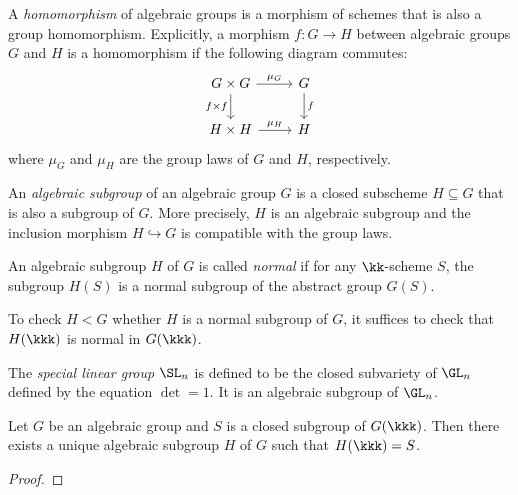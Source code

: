    \begin{definition}\label{def:homomorphism_of_algebraic_groups}
        A \emph{homomorphism} of algebraic groups is a morphism of schemes that is also a group homomorphism.
        Explicitly, a morphism \(f: G \to H\) between algebraic groups \(G\) and \(H\) is a homomorphism if the following diagram commutes:
        \[
            \begin{tikzcd}
                G \times G \arrow{r}{\mu_G} \arrow[d, "f\times f" swap] & G \arrow{d}{f} \\
                H \times H \arrow{r}{\mu_H} & H
            \end{tikzcd}
        \]
        where \(\mu_G\) and \(\mu_H\) are the group laws of \(G\) and \(H\), respectively.
    \end{definition}

    \begin{definition}\label{def:algebraic_subgroup}
        An \emph{algebraic subgroup} of an algebraic group \(G\) is a closed subscheme \(H \subseteq G\) that is also a subgroup of \(G\).
        More precisely, \(H\) is an algebraic subgroup and the inclusion morphism \(H \hookrightarrow G\) is compatible with the group laws.

        An algebraic subgroup \(H\) of \(G\) is called \emph{normal} if for any \(\kk\)-scheme \(S\), the subgroup \(H(S)\) is a normal subgroup of the abstract group \(G(S)\).
    \end{definition}


    \begin{remark}\label{rmk:normal_algebraic_subgroup_and_kkk_points}
        To check \(H < G\) whether \(H\) is a normal subgroup of \(G\), it suffices to check that \(H(\kkk)\) is normal in \(G(\kkk)\).
    \end{remark}

    \begin{example}\label{eg:special_linear_group}
        The \emph{special linear group} $\SL_n$ is defined to be the closed subvariety of $\GL_n$ defined by the equation \(\det = 1\).
        It is an algebraic subgroup of \(\GL_n\).
    \end{example}

    \begin{proposition}\label{prop:algebraic_group_and_its_closed_points}
        Let \(G\) be an algebraic group and \(S\) is a closed subgroup of \(G(\kkk)\).
        Then there exists a unique algebraic subgroup \(H\) of \(G\) such that \(H(\kkk) = S\).
    \end{proposition}
    \begin{proof}
    \end{proof}

